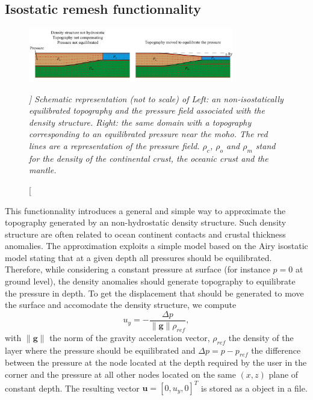 \subsection{Isostatic remesh functionnality} %
\label{sub:isostatic_remesh_functionnality}
\begin{figure} [hbtp]
\center
\includegraphics[width=0.8\textwidth]{figs/poisson_pressure.pdf}
\caption[\itshape ]
{\itshape Schematic representation (not to scale) of Left: an non-isostatically equilibrated topography and the pressure field associated with the density structure. Right: the same domain with a topography corresponding to an equilibrated pressure near the moho. The red lines are a representation of the pressure field. $\rho_c$, $\rho_o$ and $\rho_m$ stand for the density of the continental crust, the oceanic crust and the mantle.
}
\label{fig:pp_compensation}
\end{figure}
This functionnality introduces a general and simple way to approximate the topography generated by an non-hydrostatic density structure.
Such density structure are often related to ocean continent contacts and crustal thickness anomalies.
The approximation exploits a simple model based on the Airy isostatic model stating that at a given depth all pressures should be equilibrated. 
Therefore, while considering a constant pressure at surface (for instance $p=0$ at ground level), the density anomalies should generate topography to equilibrate the pressure in depth.
To get the displacement that should be generated to move the surface and accomodate the density structure, we compute 
$$
  u_y = -\frac{\Delta p}{\| \boldsymbol g\| \rho_{ref}},
$$
with $\| \boldsymbol g\|$ the norm of the gravity acceleration vector, $\rho_{ref}$ the density of the layer where the pressure should be equilibrated and $\Delta p = p - p_{ref}$ the difference between the pressure at the node located at the depth required by the user in the  corner and the pressure at all other nodes located on the same $(x, z)$ plane of constant depth.
The resulting vector $\boldsymbol u = [0, u_y, 0]^T$ is stored as a {\PETSc}  object in a  file.

